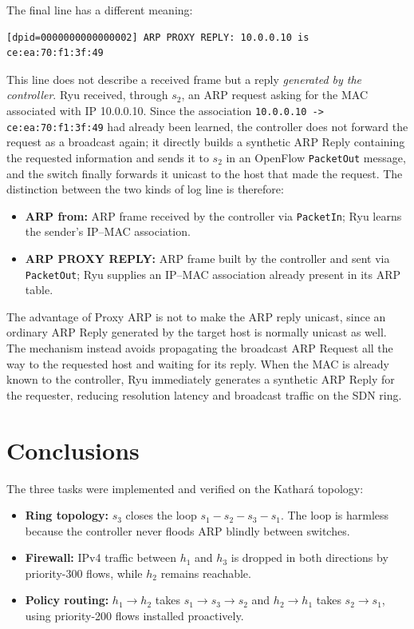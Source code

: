\documentclass[11pt,a4paper]{article}
\newcommand{\code}[1]{\texttt{#1}}
\begin{document}
The final line has a different meaning:
\begin{lstlisting}
[dpid=0000000000000002] ARP PROXY REPLY: 10.0.0.10 is ce:ea:70:f1:3f:49
\end{lstlisting}
This line does not describe a received frame but a reply \emph{generated by the
controller}. Ryu received, through $s_2$, an ARP request asking for the MAC
associated with IP 10.0.0.10. Since the association
\code{10.0.0.10 -> ce:ea:70:f1:3f:49} had already been learned, the controller
does not forward the request as a broadcast again; it directly builds a synthetic
ARP Reply containing the requested information and sends it to $s_2$ in an
OpenFlow \code{PacketOut} message, and the switch finally forwards it unicast to
the host that made the request. The distinction between the two kinds of log line
is therefore:
\begin{itemize}
  \item \textbf{ARP from:} ARP frame received by the controller via
        \code{PacketIn}; Ryu learns the sender's IP--MAC association.
  \item \textbf{ARP PROXY REPLY:} ARP frame built by the controller and sent via
        \code{PacketOut}; Ryu supplies an IP--MAC association already present in
        its ARP table.
\end{itemize}

The advantage of Proxy ARP is not to make the ARP reply unicast, since an
ordinary ARP Reply generated by the target host is normally unicast as well.
The mechanism instead avoids propagating the broadcast ARP Request all the way to
the requested host and waiting for its reply. When the MAC is already known to
the controller, Ryu immediately generates a synthetic ARP Reply for the
requester, reducing resolution latency and broadcast traffic on the SDN ring.

\section{Conclusions}
The three tasks were implemented and verified on the Kathar\'a topology:
\begin{itemize}
  \item \textbf{Ring topology:} $s_3$ closes the loop $s_1 - s_2 - s_3 - s_1$.
        The loop is harmless because the controller never floods ARP blindly
        between switches.
  \item \textbf{Firewall:} IPv4 traffic between $h_1$ and $h_3$ is dropped in
        both directions by priority-300 flows, while $h_2$ remains reachable.
  \item \textbf{Policy routing:} $h_1\to h_2$ takes $s_1\to s_3\to s_2$ and
        $h_2\to h_1$ takes $s_2\to s_1$, using priority-200 flows installed
        proactively.
\end{itemize}
\end{document}
